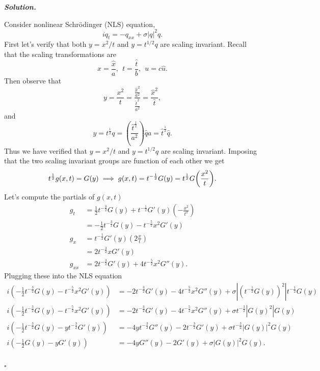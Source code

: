 \documentclass[12pt]{report}
\newenvironment{solution}[1][\it{Solution}]{\textbf{#1. } }{$\square$}
\def\half{\frac{1}{2}}
\newcommand{\paren}[1]{{\left(#1\right)}} %
\newcommand{\abs}[1]{{\left|#1\right|}} %
\begin{document}
\begin{solution}

    \noindent
    Consider nonlinear Schr\"odinger (NLS) equation,
    \[ 
        i q_t = -q_{xx} + \sigma \abs{q}^2q.
    \]
    First let's verify that both $y = x^2/t$ and $y = t^{1/2}q$ are scaling invariant. Recall that the scaling transformations are
    \[
        x = \frac{\hat{x}}{a}, ~~ t = \frac{\hat{t}}{b}, ~~ u=c\hat{u}.
    \]
    Then observe that
    \[
        y = \frac{x^2}{t} = \frac{\frac{\hat{x}^2}{a^2}}{\frac{\hat{t}^2}{a^2}} = \frac{\hat{x}^2}{\hat{t}},
    \]
    and
    \[
        y = t^{\frac{1}{2}}q = \paren{\frac{\hat{t}^\frac{1}{2}}{a^2}}\hat{q}a = \hat{t}^{\frac{1}{2}} \hat{q}.
    \]
    Thus we have verified that $y = x^2/t$ and $y = t^{1/2}q$ are scaling invariant. Imposing that the two scaling invariant groups are function of each other we get
    \[
        t^{\frac{1}{2}}g(x,t) = G(y) \implies g(x,t) = t^{-\frac{1}{2}}G(y) = t^{\-\frac{1}{2}}G\paren{\frac{x^2}{t}}.
    \]
    Let's compute the partials of $g(x,t)$
    \begin{align*}
        g_t &= \frac{1}{2}t^{-\frac{3}{2}}G(y) + t^{-\frac{1}{2}}G'(y)\paren{-\frac{x^2}{t^2}}\\
            &= -\frac{1}{2}t^{-\frac{3}{2}}G(y) - t^{-\frac{5}{2}}x^2G'(y)\\
        g_x &= t^{-\half}G'(y)(2 \frac{x}{t})\\
            &= 2t^{-\frac{3}{2}}xG'(y)\\
        g_{xx} &= 2t^{-\frac{3}{2}}G'(y) + 4t^{-\frac{5}{2}}x^2G''(y).
    \end{align*}
    Plugging these into the NLS equation
    \begin{align*}
        i\paren{-\frac{1}{2}t^{-\frac{3}{2}}G(y) - t^{-\frac{5}{2}}x^2G'(y)} &= -2t^{-\frac{3}{2}}G'(y) - 4t^{-\frac{5}{2}}x^2G''(y) + \sigma\abs{\paren{t^{-\half}G(y)}^2}t^{-\half}G(y)\\
        i\paren{-\frac{1}{2}t^{-\frac{3}{2}}G(y) - t^{-\frac{5}{2}}x^2G'(y)} &= -2t^{-\frac{3}{2}}G'(y) - 4t^{-\frac{5}{2}}x^2G''(y) + \sigma t^{-\frac{3}{2}}\abs{G(y)^2}G(y)\\
        i\paren{-\half t^{-\frac{3}{2}}G(y)-yt^{-\frac{3}{2}}G'(y)} &= -4yt^{-\frac{3}{2}}G''(y) - 2t^{-\frac{3}{2}}G'(y) + \sigma t^{-\frac{3}{2}}\abs{G(y)}^2G(y)\\
        i\paren{-\half G(y)-yG'(y)} &= -4yG''(y) - 2G'(y) + \sigma \abs{G(y)}^2G(y).\\
    \end{align*}

\end{solution}
\end{document}
